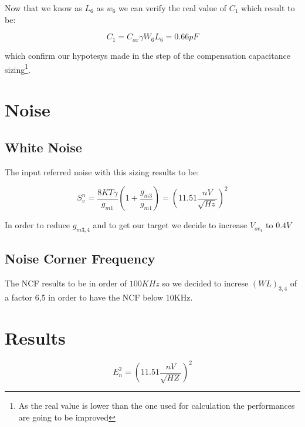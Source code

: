 Now that we know as $L_6$ as $w_6$ we can verify the real value of $C_1$ which result to be:

\begin{equation}
  C_1 = C_{ox} \gamma W_6 L_6 = 0.66pF
\end{equation}

which confirm our hypotesys made in the step of the compensation capacitance sizing\footnote{As the real value is lower than the one used for calculation the performances are going to be improved}.



\section{Noise} %
\label{sec:noise}


\subsection{White Noise} %
\label{ssub:white_noise}


The input referred noise with this sizing results to be:

\begin{equation}
  S_v^n= \frac{8KT\gamma}{g_{m1}}(1+\frac{g_ {m3}}{g_{m1}}) = (11.51 \frac{nV}{\sqrt{Hz}})^2
\end{equation}

In order to reduce $g_{m3,4}$ and to get our target we decide to increase $V_{ov_4}$ to $0.4V$

\subsection{Noise Corner Frequency} %
\label{ssub:noise_corner_frequency}

The NCF results to be in order of $100KHz$ so we decided to increse $(WL)_{3,4}$ of a factor 6,5 in order to have the NCF below 10KHz.



\section{Results} %
\label{sec:results}


\begin{equation}
  E_n^2=( 11.51 \frac {nV} { \sqrt{HZ}})^2
\end{equation}

